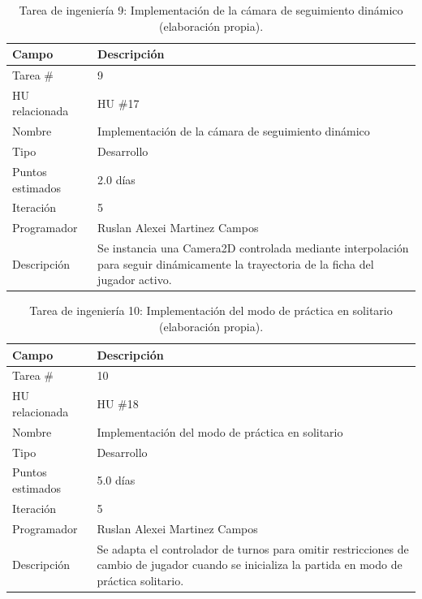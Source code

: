 \begin{table}[H]
\centering
\caption{Tarea de ingeniería 9: Implementación de la cámara de seguimiento dinámico (elaboración propia).\label{tab:ti9}}
\begin{tabular}{|p{}|p{}|}
\hline
\textbf{Campo} & \textbf{Descripción} \\
\hline
Tarea \# & 9 \\
\hline
HU relacionada & HU \#17 \\
\hline
Nombre & Implementación de la cámara de seguimiento dinámico \\
\hline
Tipo & Desarrollo \\
\hline
Puntos estimados & 2.0 días \\
\hline
Iteración & 5 \\
\hline
Programador & Ruslan Alexei Martinez Campos \\
\hline
Descripción & Se instancia una Camera2D controlada mediante interpolación para seguir dinámicamente la trayectoria de la ficha del jugador activo. \\
\hline
\end{tabular}
\end{table}

\begin{table}[H]
\centering
\caption{Tarea de ingeniería 10: Implementación del modo de práctica en solitario (elaboración propia).\label{tab:ti10}}
\begin{tabular}{|p{}|p{}|}
\hline
\textbf{Campo} & \textbf{Descripción} \\
\hline
Tarea \# & 10 \\
\hline
HU relacionada & HU \#18 \\
\hline
Nombre & Implementación del modo de práctica en solitario \\
\hline
Tipo & Desarrollo \\
\hline
Puntos estimados & 5.0 días \\
\hline
Iteración & 5 \\
\hline
Programador & Ruslan Alexei Martinez Campos \\
\hline
Descripción & Se adapta el controlador de turnos para omitir restricciones de cambio de jugador cuando se inicializa la partida en modo de práctica solitario. \\
\hline
\end{tabular}
\end{table}
